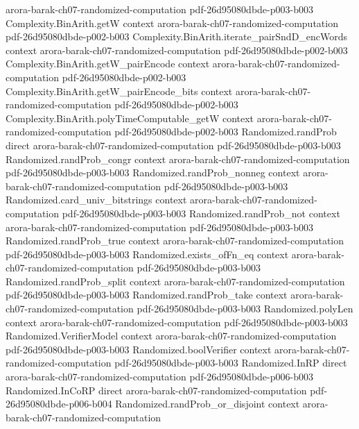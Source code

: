 \begin{theorem}
  {arora-barak-ch07-randomized-computation}
  {pdf-26d95080dbde-p003-b003}
\proofstep
  {Complexity.BinArith.getW}
  {context}
  {arora-barak-ch07-randomized-computation}
  {pdf-26d95080dbde-p002-b003}
\proofstep
  {Complexity.BinArith.iterate_pairSndD_encWords}
  {context}
  {arora-barak-ch07-randomized-computation}
  {pdf-26d95080dbde-p002-b003}
\proofstep
  {Complexity.BinArith.getW_pairEncode}
  {context}
  {arora-barak-ch07-randomized-computation}
  {pdf-26d95080dbde-p002-b003}
\proofstep
  {Complexity.BinArith.getW_pairEncode_bits}
  {context}
  {arora-barak-ch07-randomized-computation}
  {pdf-26d95080dbde-p002-b003}
\proofstep
  {Complexity.BinArith.polyTimeComputable_getW}
  {context}
  {arora-barak-ch07-randomized-computation}
  {pdf-26d95080dbde-p002-b003}
\proofstep
  {Randomized.randProb}
  {direct}
  {arora-barak-ch07-randomized-computation}
  {pdf-26d95080dbde-p003-b003}
\proofstep
  {Randomized.randProb_congr}
  {context}
  {arora-barak-ch07-randomized-computation}
  {pdf-26d95080dbde-p003-b003}
\proofstep
  {Randomized.randProb_nonneg}
  {context}
  {arora-barak-ch07-randomized-computation}
  {pdf-26d95080dbde-p003-b003}
\proofstep
  {Randomized.card_univ_bitstrings}
  {context}
  {arora-barak-ch07-randomized-computation}
  {pdf-26d95080dbde-p003-b003}
\proofstep
  {Randomized.randProb_not}
  {context}
  {arora-barak-ch07-randomized-computation}
  {pdf-26d95080dbde-p003-b003}
\proofstep
  {Randomized.randProb_true}
  {context}
  {arora-barak-ch07-randomized-computation}
  {pdf-26d95080dbde-p003-b003}
\proofstep
  {Randomized.exists_ofFn_eq}
  {context}
  {arora-barak-ch07-randomized-computation}
  {pdf-26d95080dbde-p003-b003}
\proofstep
  {Randomized.randProb_split}
  {context}
  {arora-barak-ch07-randomized-computation}
  {pdf-26d95080dbde-p003-b003}
\proofstep
  {Randomized.randProb_take}
  {context}
  {arora-barak-ch07-randomized-computation}
  {pdf-26d95080dbde-p003-b003}
\proofstep
  {Randomized.polyLen}
  {context}
  {arora-barak-ch07-randomized-computation}
  {pdf-26d95080dbde-p003-b003}
\proofstep
  {Randomized.VerifierModel}
  {context}
  {arora-barak-ch07-randomized-computation}
  {pdf-26d95080dbde-p003-b003}
\proofstep
  {Randomized.boolVerifier}
  {context}
  {arora-barak-ch07-randomized-computation}
  {pdf-26d95080dbde-p003-b003}
\proofstep
  {Randomized.InRP}
  {direct}
  {arora-barak-ch07-randomized-computation}
  {pdf-26d95080dbde-p006-b003}
\proofstep
  {Randomized.InCoRP}
  {direct}
  {arora-barak-ch07-randomized-computation}
  {pdf-26d95080dbde-p006-b004}
\proofstep
  {Randomized.randProb_or_disjoint}
  {context}
  {arora-barak-ch07-randomized-computation}

\end{theorem}
